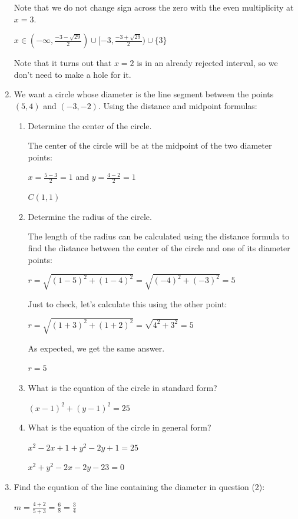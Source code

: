 \documentclass[letterpaper,12pt,fleqn]{article}
\begin{document}
\begin{enumerate}
  Note that we do not change sign across the zero with the even multiplicity
  at $x=3$.

  $x\in(-\infty,\frac{-3-\sqrt{29}}{2})\cup[-3,\frac{-3+\sqrt{29}}{2})
    \cup\{3\}$

  Note that it turns out that $x=2$ is in an already rejected interval, so we
  don't need to make a hole for it.

  \bigskip

\item We want a circle whose diameter is the line segment between the points
$(5,4)$ and $(-3,-2)$. Using the distance and midpoint formulas:
\begin{enumerate}
\item{Determine the center of the circle.}

  The center of the circle will be at the midpoint of the two diameter points:

  $x=\frac{5-3}{2}=1$ and $y=\frac{4-2}{2}=1$

  $C(1,1)$
  
\item{Determine the radius of the circle.}

  The length of the radius can be calculated using the distance formula to find
  the distance between the center of the circle and one of its diameter points:

  $r=\sqrt{(1-5)^2+(1-4)^2}=\sqrt{(-4)^2+(-3)^2}=5$

  Just to check, let's calculate this using the other point:
  
  $r=\sqrt{(1+3)^2+(1+2)^2}=\sqrt{4^2+3^2}=5$

  As expected, we get the same answer.

  $r=5$

\item{What is the equation of the circle in standard form?}

  $(x-1)^2+(y-1)^2=25$
  
\item{What is the equation of the circle in general form?}

  $x^2-2x+1+y^2-2y+1=25$

  $x^2+y^2-2x-2y-23=0$
\end{enumerate}

\item Find the equation of the line containing the diameter in question (2):

  $m = \frac{4+2}{5+3}=\frac{6}{8}=\frac{3}{4}$
  

\end{enumerate}
\end{document}
